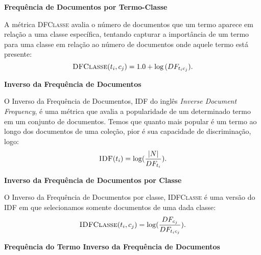 \begin{description}

\item{\textbf{Frequência de Documentos por Termo-Classe}}%
\label{item::sumdf}

A métrica \textsc{DFClasse} avalia o número de documentos que um termo aparece em relação a uma classe específica, tentando capturar a importância de um termo para uma classe em relação ao número de documentos onde aquele termo está presente:
\begin{equation}\label{eqn::sumtf}
 \textsc{DFClasse}(t_i,c_j) = 1.0 + \log{ ( DF_{t_ic_j} ) }.
\end{equation}


\item{\textbf{Inverso da Frequência de Documentos}}%
\label{item::idf}

O Inverso da Frequência de Documentos, \textsc{IDF} do inglês \textit{Inverse Document Frequency}, é uma métrica que avalia a popularidade de um determinado termo em um conjunto de documentos. Temos que quanto mais popular é um termo ao longo dos documentos de uma coleção, pior é sua capacidade de discriminação, logo:
\begin{equation}\label{eqn::tficf}
 \textsc{IDF}(t_i) = \log( \frac{|N|} {DF_{t_i}} ).
\end{equation}


\item{\textbf{Inverso da Frequência de Documentos por Classe}}%
\label{item::idf}

O Inverso da Frequência de Documentos por classe, \textsc{IDFClasse} é uma versão do \textsc{IDF} em que selecionamos somente documentos de uma dada classe:
\begin{equation}\label{eqn::tficf}
 \textsc{IDFClasse}(t_i,c_j) = \log( \frac{DF_{c_j}} {DF_{t_ic_j} }).
\end{equation}



\item{\textbf{Frequência do Termo Inverso da Frequência de Documentos}}%
\label{item::tfidf}


\end{description}
